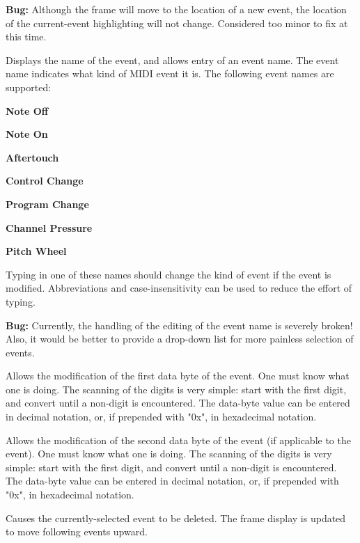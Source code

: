    \textbf{Bug:}
   Although the frame will move to the location of a new event, the location of
   the current-event highlighting will not change.  Considered too minor to fix
   at this time.

   Displays the name of the event, and allows entry of an event name.
   The event name indicates what kind of MIDI event it is. 
   The following event names are supported:

   \begin{enumber}
      \item \textbf{Note Off}
      \item \textbf{Note On}
      \item \textbf{Aftertouch}
      \item \textbf{Control Change}
      \item \textbf{Program Change}
      \item \textbf{Channel Pressure}
      \item \textbf{Pitch Wheel}
   \end{enumber}

   Typing in one of these names should change the kind of event if the event is
   modified.  Abbreviations and case-insensitivity can be used to reduce the
   effort of typing.

   \textbf{Bug:}
   Currently, the handling of the editing of the event name is severely broken!
   Also, it would be better to provide a drop-down list for more painless
   selection of events.

   Allows the modification of the first data byte of the event.
   One must know what one is doing.
   The scanning of the digits is very simple:  start with the first digit, and
   convert until a non-digit is encountered.  The data-byte value can be
   entered in decimal notation, or, if prepended with "0x", in hexadecimal
   notation.

   Allows the modification of the second data byte of the event (if applicable
   to the event).
   One must know what one is doing.
   The scanning of the digits is very simple:  start with the first digit, and
   convert until a non-digit is encountered.  The data-byte value can be
   entered in decimal notation, or, if prepended with "0x", in hexadecimal
   notation.

   Causes the currently-selected event to be deleted.
   The frame display is updated to move following events upward.

